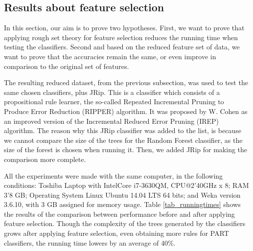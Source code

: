 \documentclass{llncs}
\begin{document}
\subsection{Results about feature selection}
\label{subsec:RSTresults}

In this section, our aim is to prove two hypotheses. First, we want to prove that applying rough set theory for feature selection reduces the running time when testing the classifiers. Second and based on the reduced feature set of data, we want to prove that the accuracies remain the same, or even improve in comparison to the original set of features.

The resulting reduced dataset, from the previous subsection, was used to test the same chosen classifiers, plus JRip. This is a classifier which consists of a propositional rule learner, the so-called Repeated Incremental Pruning to Produce Error Reduction (RIPPER) algorithm. It was proposed by W. Cohen \cite{cohen1995fast} as an improved version of the Incremental Reduced Error Pruning (IREP) algorithm. The reason why this JRip classifier was added to the list, is because we cannot compare the size of the trees for the Random Forest classifier, as the size of the forest is chosen when running it. Then, we added JRip for making the comparison more complete.

All the experiments were made with the same computer, in the following conditions: Toshiba Laptop with Intel\texttrademark  Core i7-3630QM, CPU@2'40GHz x 8; RAM 3'8 GB; Operating System Linux Ubuntu 14.04 LTS 64 bits; and Weka version 3.6.10, with 3 GB assigned for memory usage. Table \ref{tab_runningtimes} shows the results of the comparison between performance before and after applying feature selection. Though the complexity of the trees generated by the classifiers grows after applying feature selection, even obtaining more rules for PART classifiers, the running time lowers by an average of 40\%.  
\end{document}

